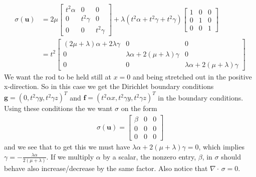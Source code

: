 \documentclass[twoside]{article}
\begin{document}
\begin{align}
	\sigma(\mathbf{u}) &= 2 \mu
				\begin{bmatrix}
					t^2 \alpha    & 0 & 0 \\
					0 & t^2 \gamma & 0 \\
					0 & 0 & t^2 \gamma
				\end{bmatrix}
			+ \lambda (t^2 \alpha + t^2 \gamma + t^2 \gamma)
				\begin{bmatrix}
					1    & 0 & 0 \\
					0 & 1 & 0 \\
					0 & 0 & 1
				\end{bmatrix} \nonumber\\
			&= t^2\begin{bmatrix}
					(2\mu + \lambda) \alpha + 2\lambda \gamma   & 0 & 0 \\
					0 & \lambda \alpha + 2(\mu + \lambda) \gamma & 0 \\
					0 & 0 & \lambda \alpha + 2(\mu + \lambda) \gamma
				\end{bmatrix}
\end{align}
We want the rod to be held still at \( x = 0\) and being stretched out in the positive x-direction. So in this  case we get the Dirichlet boundary conditions \( \mathbf{g} = (0, t^2\gamma y, t^2 \gamma z)^T\) and \( \mathbf{f} = (t^2 \alpha x, t^2 \gamma y, t^2 \gamma z)^T\) in the boundary conditions. Using these conditions the we want \( \sigma\) on the form
\begin{align}
	\sigma(\mathbf{u}) = 
			\begin{bmatrix}
				\beta & 0 & 0 \\
				0 & 0 & 0 \\
				0 & 0 & 0
			\end{bmatrix}
\end{align}
and we see that to get this we must have \(\lambda \alpha + 2(\mu + \lambda) \gamma = 0 \), which implies \( \gamma = - \frac{\lambda \alpha}{2(\mu + \lambda)}\). If we multiply \( \alpha\) by a scalar,  the nonzero entry, \( \beta\), in \( \sigma\) should behave also increase/decrease by the same factor. Also notice that \( \nabla \cdot \, \sigma = 0\). 
\end{document}
